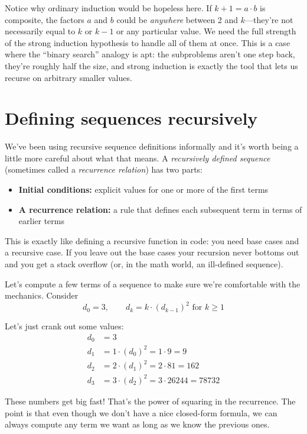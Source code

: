 \documentclass[11pt]{article}
\begin{document}
Notice why ordinary induction would be hopeless here. If $k+1 = a \cdot b$ is composite, the factors $a$ and $b$ could be \emph{anywhere} between 2 and $k$---they're not necessarily equal to $k$ or $k-1$ or any particular value. We need the full strength of the strong induction hypothesis to handle all of them at once. This is a case where the ``binary search'' analogy is apt: the subproblems aren't one step back, they're roughly half the size, and strong induction is exactly the tool that lets us recurse on arbitrary smaller values.

\section{Defining sequences recursively}
We've been using recursive sequence definitions informally and it's worth being a little more careful about what that means. A \emph{recursively defined sequence} (sometimes called a \emph{recurrence relation}) has two parts:
\begin{itemize}
  \item \textbf{Initial conditions:} explicit values for one or more of the first terms
  \item \textbf{A recurrence relation:} a rule that defines each subsequent term in terms of earlier terms
\end{itemize}

This is exactly like defining a recursive function in code: you need base cases and a recursive case. If you leave out the base cases your recursion never bottoms out and you get a stack overflow (or, in the math world, an ill-defined sequence).

Let's compute a few terms of a sequence to make sure we're comfortable with the mechanics. Consider
\[
d_0 = 3, \qquad d_k = k \cdot (d_{k-1})^2 \text{ for } k \geq 1
\]

Let's just crank out some values:
\begin{align*}
d_0 &= 3 \\
d_1 &= 1 \cdot (d_0)^2 = 1 \cdot 9 = 9 \\
d_2 &= 2 \cdot (d_1)^2 = 2 \cdot 81 = 162 \\
d_3 &= 3 \cdot (d_2)^2 = 3 \cdot 26244 = 78732
\end{align*}

These numbers get big fast! That's the power of squaring in the recurrence. The point is that even though we don't have a nice closed-form formula, we can always compute any term we want as long as we know the previous ones.
\end{document}
